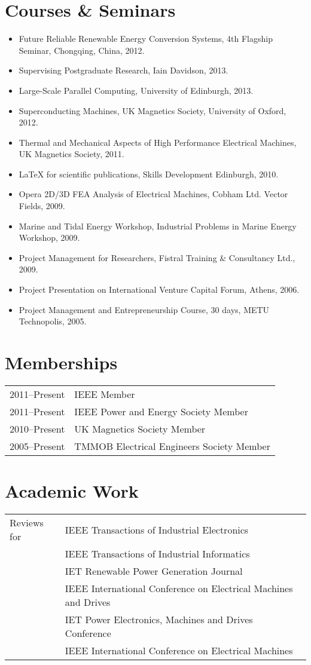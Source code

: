 \documentclass[a4paper,12pt]{article}
\begin{document}
\section{Courses \& Seminars}
\begin{itemize}
\item Future Reliable Renewable Energy Conversion Systems, 4th Flagship Seminar, Chongqing, China, 2012.
\item Supervising Postgraduate Research, Iain Davidson, 2013. 
\item Large-Scale Parallel Computing, University of Edinburgh, 2013.
\item Superconducting Machines, UK Magnetics Society, University of Oxford, 2012.
\item Thermal and Mechanical Aspects of High Performance Electrical Machines, UK Magnetics Society, 2011.
\item LaTeX for scientific publications, Skills Development Edinburgh, 2010.
\item Opera 2D/3D FEA Analysis of Electrical Machines, Cobham Ltd. Vector Fields, 2009.
\item Marine and Tidal Energy Workshop, Industrial Problems in Marine Energy Workshop, 2009.
\item Project Management for Researchers, Fistral Training \& Consultancy Ltd., 2009.
\item Project Presentation on International Venture Capital Forum, Athens, 2006.
\item Project Management and Entrepreneurship Course, 30 days, METU Technopolis, 2005.
\end{itemize}




\section{Memberships}
\begin{tabular}{ll}
2011--Present & IEEE Member \\
2011--Present & IEEE Power and Energy Society Member \\
2010--Present & UK Magnetics Society Member\\
2005--Present & TMMOB Electrical Engineers Society Member\\
\end{tabular}

\section{Academic Work}
\begin{tabular}{ll}
Reviews for & IEEE Transactions of Industrial Electronics \\
& IEEE Transactions of Industrial Informatics \\
& IET Renewable Power Generation Journal \\
& IEEE International Conference on Electrical Machines and Drives \\
& IET Power Electronics, Machines and Drives Conference \\
& IEEE International Conference on Electrical Machines\\
\end{tabular}
\end{document}

